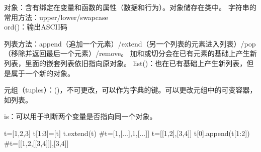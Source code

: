 \documentclass{ctexart}
\begin{document}
对象：含有绑定在变量和函数的属性（数据和行为）。对象储存在类中。
字符串的常用方法：upper/lower/swapcase
\\ord()：输出ASCII码

列表方法：append（追加一个元素）/extend（另一个列表的元素进入列表）/pop（移除并返回最后一个元素）/remove。
加和或切分会在已有元素的基础上产生新列表，里面的嵌套列表依旧指向原对象。
list()：也在已有基础上产生新列表，但是属于一个新的对象。

元组（tuples）：()，不可更改，可以作为字典的键。可以更改元组中的可变容器，如列表。

is：可以用于判断两个变量是否指向同一个对象。

\begin{python}
    t=[1,2,3]
    t[1:3]=[t]
    t.extend(t)
    #t=[1,[...],1,[...]]
    t=[[1,2],[3,4]]
    t[0].append(t[1:2])
    #t=[[1,2,[[3,4]]],[3,4]]
\end{python}
\end{document}
